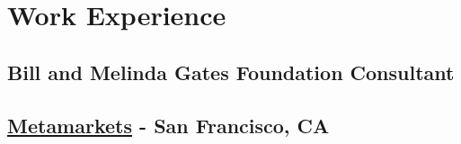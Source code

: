 \documentclass[10.5pt, sans]{moderncv}
\begin{document}
%


\newpage
\section{Work Experience}

  \subsection{Bill and Melinda Gates Foundation Consultant}


  \subsection{\href{http://metamarkets.com/}{Metamarkets} - San Francisco, CA}
\end{document}
